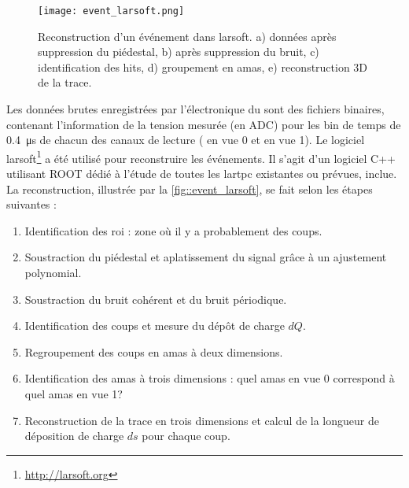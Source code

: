         \begin{figure}[htbp]
          \centering
          \texttt{[image: event\_larsoft.png]}
          \caption[Reconstruction d'un événement dans \gls{larsoft}.]{\label{fig::event_larsoft}Reconstruction d'un événement dans \gls{larsoft}. a) données après suppression du piédestal, b) après suppression du bruit, c) identification des hits, d) groupement en amas, e) reconstruction 3D de la trace.}
        \end{figure}
        Les données brutes enregistrées par l'électronique du \TOO{} sont des fichiers binaires, contenant l'information de la tension mesurée (en ADC) pour les  bin de temps de \SI{0.4}{\micro\second} de chacun des  canaux de lecture ( en vue 0 et  en vue 1). Le logiciel \gls{larsoft}\footnote{\url{http://larsoft.org}} a été utilisé pour reconstruire les événements. Il s'agit d'un logiciel C++ utilisant ROOT dédié à l'étude de toutes les \gls{lartpc} existantes ou prévues, \protodp{} inclue.  La reconstruction, illustrée par la \autoref{fig::event_larsoft}, se fait selon les étapes suivantes :
        \begin{enumerate}
          \item Identification des \gls{roi} : zone où il y a probablement des coups.
          \item Soustraction du piédestal et aplatissement du signal grâce à un ajustement polynomial.
          \item Soustraction du bruit cohérent et du bruit périodique.
          \item Identification des coups et mesure du dépôt de charge $dQ$.
          \item Regroupement des coups en amas à deux dimensions.
          \item Identification des amas à trois dimensions : quel amas en vue 0 correspond à quel amas en vue 1?
          \item Reconstruction de la trace en trois dimensions et calcul de la longueur de déposition de charge $ds$ pour chaque coup.
        \end{enumerate}
